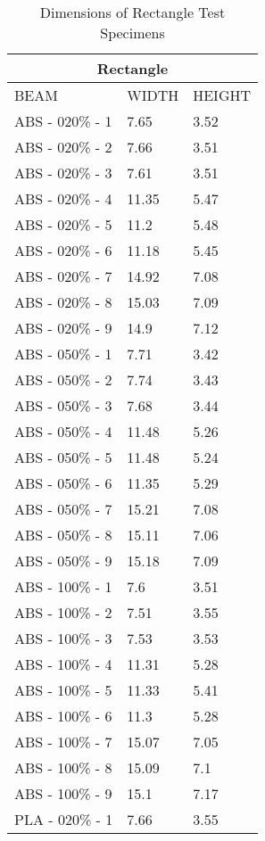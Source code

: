 \begin{longtable}{ | X | X | X | }
	\caption{Dimensions of Rectangle Test Specimens}
	\label{tab:rectangle_dims}
	\endhead
	\hline
	\multicolumn{3}{|c|}{Rectangle} \\ \hline
	BEAM & WIDTH & HEIGHT \\ \hline
	ABS - 020\% - 1 & 7.65 & 3.52 \\ \hline
	ABS - 020\% - 2 & 7.66 & 3.51 \\ \hline
	ABS - 020\% - 3 & 7.61 & 3.51 \\ \hline
	ABS - 020\% - 4 & 11.35 & 5.47 \\ \hline
	ABS - 020\% - 5 & 11.2 & 5.48 \\ \hline
	ABS - 020\% - 6 & 11.18 & 5.45 \\ \hline
	ABS - 020\% - 7 & 14.92 & 7.08 \\ \hline
	ABS - 020\% - 8 & 15.03 & 7.09 \\ \hline
	ABS - 020\% - 9 & 14.9 & 7.12 \\ \hline
	ABS - 050\% - 1 & 7.71 & 3.42 \\ \hline
	ABS - 050\% - 2 & 7.74 & 3.43 \\ \hline
	ABS - 050\% - 3 & 7.68 & 3.44 \\ \hline
	ABS - 050\% - 4 & 11.48 & 5.26 \\ \hline
	ABS - 050\% - 5 & 11.48 & 5.24 \\ \hline
	ABS - 050\% - 6 & 11.35 & 5.29 \\ \hline
	ABS - 050\% - 7 & 15.21 & 7.08 \\ \hline
	ABS - 050\% - 8 & 15.11 & 7.06 \\ \hline
	ABS - 050\% - 9 & 15.18 & 7.09 \\ \hline
	ABS - 100\% - 1 & 7.6 & 3.51 \\ \hline
	ABS - 100\% - 2 & 7.51 & 3.55 \\ \hline
	ABS - 100\% - 3 & 7.53 & 3.53 \\ \hline
	ABS - 100\% - 4 & 11.31 & 5.28 \\ \hline
	ABS - 100\% - 5 & 11.33 & 5.41 \\ \hline
	ABS - 100\% - 6 & 11.3 & 5.28 \\ \hline
	ABS - 100\% - 7 & 15.07 & 7.05 \\ \hline
	ABS - 100\% - 8 & 15.09 & 7.1 \\ \hline
	ABS - 100\% - 9 & 15.1 & 7.17 \\ \hline
	PLA - 020\% - 1 & 7.66 & 3.55 \\ \hline

\end{longtable}
